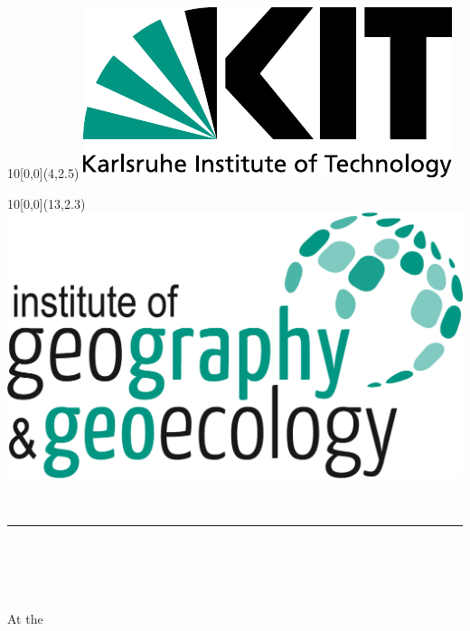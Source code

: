 
\newcommand{\diameter}{20}
\newcommand{\xone}{-15}
\newcommand{\xtwo}{160}
\newcommand{\yone}{15}
\newcommand{\ytwo}{-253}

\begin{titlepage}
	\begin{textblock}{10}[0,0](4,2.5)
		\includegraphics[width=.3\textwidth]{logos/KITLogo_EN_RGB.pdf}
	\end{textblock}
	\begin{textblock}{10}[0,0](13,2.3)
		\includegraphics[width=.3\textwidth]{logos/ifgg_lang_e.png}	\end{textblock}
	\vspace*{3.5cm}
	\begin{center}
		\Huge{\mytitle}\\
		\rule{0.05\textwidth}{0.5pt}\\
		\Large{
			\mytype
		}\\
		\vspace*{1cm}
		\huge{\myname}\\
			\Large{\matricle}\\
		\vspace*{1cm}
		\Large{
			At the
			\\
}
\end{center}
\end{titlepage}

